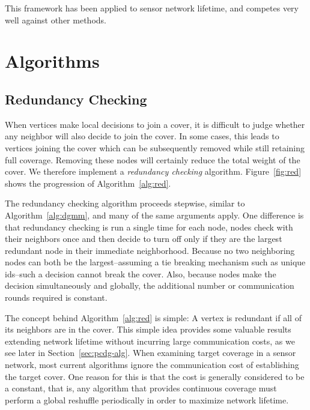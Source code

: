 This framework has been applied to sensor network lifetime, and competes very well against other methods\cite{Dhawan:hipc-09}.

\section{Algorithms}
\label{sec:algorithms}

\subsection{Redundancy Checking}
\label{sec:redundant}
When vertices make local decisions to join a cover, it is difficult to judge whether any neighbor will also decide to join the cover. In some cases, this leads to vertices joining the cover which can be subsequently removed while still retaining full coverage. Removing these nodes will certainly reduce the total weight of the cover. We therefore implement a {\em redundancy checking} algorithm. Figure~\ref{fig:red} shows the progression of Algorithm~\ref{alg:red}.

 



The redundancy checking algorithm proceeds stepwise, similar to Algorithm~\ref{alg:dgmm}, and many of the same arguments apply. One difference is that redundancy checking is run a single time for each node, nodes check with their neighbors once and then decide to turn off only if they are the largest redundant node in their immediate neighborhood. Because no two neighboring nodes can both be the largest--assuming a tie breaking mechanism such as unique ids--such a decision cannot break the cover. Also, because nodes make the decision simultaneously and globally, the additional number or communication rounds required is constant.

The concept behind Algorithm~\ref{alg:red} is simple: A vertex is redundant if all of its neighbors are in the cover. This simple idea provides some valuable results extending network lifetime without incurring large communication costs, as we see later in Section~\ref{sec:pcdg-alg}. When examining target coverage in a sensor network, most current algorithms ignore the communication cost of establishing the target cover\cite{1514028}. One reason for this is that the cost is generally considered to be a constant, that is, any algorithm that provides continuous coverage must perform a global reshuffle periodically in order to maximize network lifetime. 


